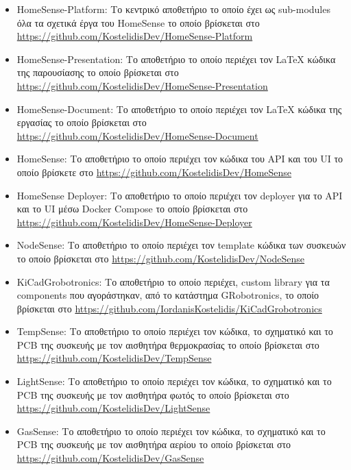 \documentclass[conference]{IEEEtran}
\begin{document}
\begin{itemize}
	\item HomeSense-Platform: Το κεντρικό αποθετήριο το οποίο έχει ως sub-modules όλα τα σχετικά έργα του HomeSense το οποίο βρίσκεται στο \url{https://github.com/KostelidisDev/HomeSense-Platform}
	\item HomeSense-Presentation: Το αποθετήριο το οποίο περιέχει τον LaTeX κώδικα της παρουσίασης το οποίο βρίσκεται στο \url{https://github.com/KostelidisDev/HomeSense-Presentation}
	\item HomeSense-Document: Το αποθετήριο το οποίο περιέχει τον LaTeX κώδικα της εργασίας το οποίο βρίσκεται στο \url{https://github.com/KostelidisDev/HomeSense-Document}
	\item HomeSense: Το αποθετήριο το οποίο περιέχει τον κώδικα του API και του UI το οποίο βρίσκετε στο \url{https://github.com/KostelidisDev/HomeSense}
	\item HomeSense Deployer: Το αποθετήριο το οποίο περιέχει τον deployer για το API και το UI μέσω Docker Compose το οποίο βρίσκεται στο \url{https://github.com/KostelidisDev/HomeSense-Deployer}
	\item NodeSense: Το αποθετήριο το οποίο περιέχει τον template κώδικα των συσκευών το οποίο βρίσκεται στο \url{https://github.com/KostelidisDev/NodeSense}
	\item KiCadGrobotronics: Το αποθετήριο το οποίο περιέχει, custom library για τα components που αγοράστηκαν, από το κατάστημα GRobotronics, το οποίο βρίσκεται στο \url{https://github.com/IordanisKostelidis/KiCadGrobotronics}
	\item TempSense: Το αποθετήριο το οποίο περιέχει τον κώδικα, το σχηματικό και το PCB της συσκευής με τον αισθητήρα θερμοκρασίας το οποίο βρίσκεται στο \url{https://github.com/KostelidisDev/TempSense}
	\item LightSense: Το αποθετήριο το οποίο περιέχει τον κώδικα, το σχηματικό και το PCB της συσκευής με τον αισθητήρα φωτός το οποίο βρίσκεται στο \url{https://github.com/KostelidisDev/LightSense}
	\item GasSense: Το αποθετήριο το οποίο περιέχει τον κώδικα, το σχηματικό και το PCB της συσκευής με τον αισθητήρα αερίου το οποίο βρίσκεται στο \url{https://github.com/KostelidisDev/GasSense}
\end{itemize}
\end{document}
